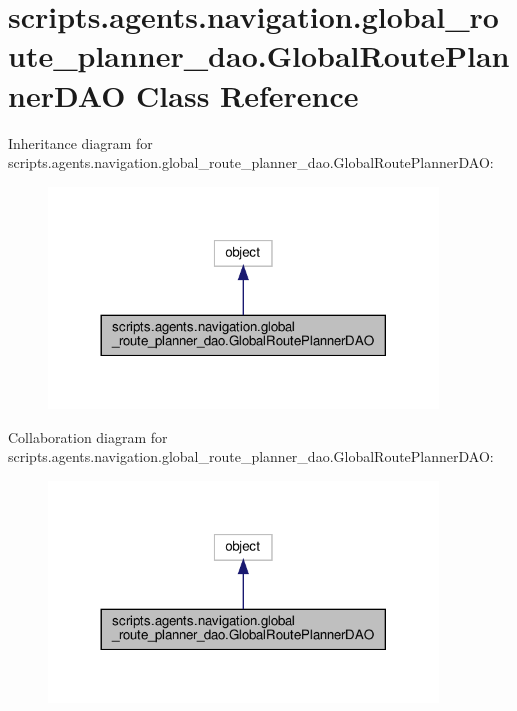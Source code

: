 \hypertarget{classscripts_1_1agents_1_1navigation_1_1global__route__planner__dao_1_1GlobalRoutePlannerDAO}{}\section{scripts.\+agents.\+navigation.\+global\+\_\+route\+\_\+planner\+\_\+dao.\+Global\+Route\+Planner\+D\+AO Class Reference}
\label{classscripts_1_1agents_1_1navigation_1_1global__route__planner__dao_1_1GlobalRoutePlannerDAO}


Inheritance diagram for scripts.\+agents.\+navigation.\+global\+\_\+route\+\_\+planner\+\_\+dao.\+Global\+Route\+Planner\+D\+AO\+:\nopagebreak
\begin{figure}[H]
\begin{center}
\leavevmode
\includegraphics[width=293pt]{d1/dee/classscripts_1_1agents_1_1navigation_1_1global__route__planner__dao_1_1GlobalRoutePlannerDAO__inherit__graph}
\end{center}
\end{figure}


Collaboration diagram for scripts.\+agents.\+navigation.\+global\+\_\+route\+\_\+planner\+\_\+dao.\+Global\+Route\+Planner\+D\+AO\+:\nopagebreak
\begin{figure}[H]
\begin{center}
\leavevmode
\includegraphics[width=293pt]{db/d72/classscripts_1_1agents_1_1navigation_1_1global__route__planner__dao_1_1GlobalRoutePlannerDAO__coll__graph}
\end{center}
\end{figure}
